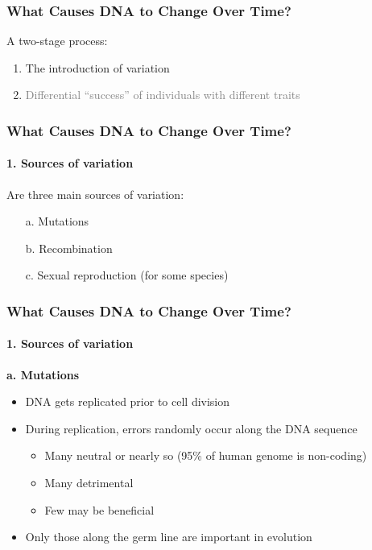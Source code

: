 \documentclass[10pt]{beamer}
\begin{document}
\begin{frame}[t]
\frametitle{What Causes DNA to Change Over Time?}
\vspace{0.5cm}

	A two-stage process:
	\smallskip
	
		\begin{enumerate}
			\item The introduction of variation
			\smallskip
			\item \textcolor{gray}{Differential ``success'' of individuals with different traits}
		\end{enumerate}
\end{frame}		


\begin{frame}[t]
\frametitle{What Causes DNA to Change Over Time?}
\framesubtitle{1. Sources of variation}
\vspace{0.5cm}

	Are three main sources of variation:
	\medskip
		\begin{enumerate}
			\item[a.] Mutations
			\medskip
			\item[b.] Recombination
			\medskip
			\item[c.] Sexual reproduction (for some species)
		\end{enumerate}

\end{frame}


\begin{frame}[t]
\frametitle{What Causes DNA to Change Over Time?}
\framesubtitle{1. Sources of variation}
\vspace{0.5cm}

	\textbf{\textcolor{myblue}{a.} Mutations}\\
		\medskip
		\begin{itemize}
			\item DNA gets replicated prior to cell division
			\medskip
			\item During replication, errors randomly occur along the DNA sequence
				\smallskip
				\begin{itemize}
					\item Many neutral or nearly so (95\% of human genome is non-coding)
					\smallskip
					\item Many detrimental
					\smallskip
					\item Few may be beneficial\\
				\end{itemize}
			\medskip
			\item Only those along the \textcolor{myblue}{germ line} are important in evolution 	
		\end{itemize}
\end{frame}
\end{document}
